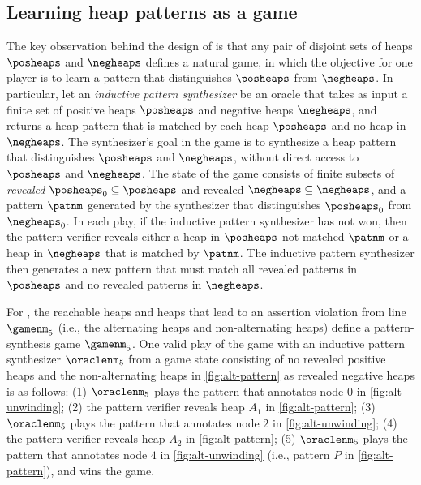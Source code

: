 \subsection{Learning heap patterns as a game}
\label{sec:ex-heap-games}
The key observation behind the design of \verifier is that any pair of
disjoint sets of heaps $\posheaps$ and $\negheaps$ defines a natural
game, in which the objective for one player is to learn a pattern that
distinguishes $\posheaps$ from $\negheaps$.
In particular, let an \emph{inductive pattern synthesizer} be an
oracle that takes as input a finite set of positive heaps $\posheaps$
and negative heaps $\negheaps$, and returns a heap pattern that is
matched by each heap $\posheaps$ and no heap in $\negheaps$.
%
The synthesizer's goal in the game is to synthesize a heap pattern
that distinguishes $\posheaps$ and $\negheaps$, without direct access
to $\posheaps$ and $\negheaps$.
%
The state of the game consists of finite subsets of \emph{revealed}
$\posheaps_0 \subseteq \posheaps$ and revealed $\negheaps \subseteq
\negheaps$, and a pattern $\patnm$ generated by the synthesizer that
distinguishes $\posheaps_0$ from $\negheaps_0$.
%
In each play, if the inductive pattern synthesizer has not won, then
the pattern verifier reveals either a heap in $\posheaps$ not matched
$\patnm$ or a heap in $\negheaps$ that is matched by $\patnm$.
%
The inductive pattern synthesizer then generates a new pattern that
must match all revealed patterns in $\posheaps$ and no revealed
patterns in $\negheaps$.
\begin{ex}
  \label{ex:alt-list-game}
  For \altlist, the reachable heaps and heaps that lead to an
  assertion violation from line $\gamenm_5$ (i.e., the alternating
  heaps and non-alternating heaps) define a pattern-synthesis game
  $\gamenm_5$.
  One valid play of the game with an inductive pattern synthesizer
  $\oraclenm_5$ from a game state consisting of no revealed positive
  heaps and the non-alternating heaps in \autoref{fig:alt-pattern} as
  revealed negative heaps is as follows:
  (1) $\oraclenm_5$ plays the pattern that annotates node $0$ in
  \autoref{fig:alt-unwinding};
  (2) the pattern verifier reveals heap $A_1$ in
  \autoref{fig:alt-pattern};
  (3) $\oraclenm_5$ plays the pattern that annotates node $2$ in
  \autoref{fig:alt-unwinding};
  (4) the pattern verifier reveals heap $A_2$ in
  \autoref{fig:alt-pattern};
  (5) $\oraclenm_5$ plays the pattern that annotates node $4$ in
  \autoref{fig:alt-unwinding} (i.e., pattern $P$ in
  \autoref{fig:alt-pattern}), and wins the game.
\end{ex}


